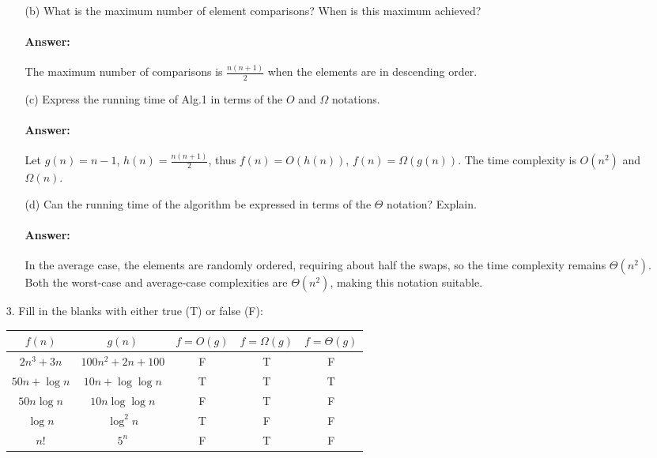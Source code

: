 \documentclass{article}
\begin{document}
\begin{itemize}
\begin{itemize}
\item[(b)] What is the maximum number of element comparisons? When is this maximum achieved?

\paragraph{Answer:} The maximum number of comparisons is $\frac{n(n+1)}{2}$ when the elements are in descending order.

\item[(c)] Express the running time of Alg.1 in terms of the \(O\) and \(\Omega\) notations.

\paragraph{Answer:} Let $g(n) = n - 1$, $h(n) = \frac{n(n+1)}{2}$, thus $f(n) = O(h(n))$, $f(n) = \Omega(g(n))$. The time complexity is $O(n^2)$ and $\Omega(n)$.

\item[(d)] Can the running time of the algorithm be expressed in terms of the \(\Theta\) notation? Explain.

\paragraph{Answer:} In the average case, the elements are randomly ordered, requiring about half the swaps, so the time complexity remains $\Theta(n^2)$. Both the worst-case and average-case complexities are $\Theta(n^2)$, making this notation suitable.
\end{itemize}

\item[3.] Fill in the blanks with either true (T) or false (F):

\begin{center}
    \begin{tabular}{|c|c|c|c|c|} 
    \hline
    $f(n)$ & $g(n)$ & $f=O(g) $ &$f=\Omega(g)$  &$f=\Theta(g)$ \\
    \hline\hline
    $2n^3+3n$ & $100n^2 + 2n +100$ &F &T&F \\\hline
    $50n + \log n $ & $10n+\log\log n$ &T &T& T\\\hline
    $50n\log n$ & $10n\log\log n$ & F&T& F\\\hline
    $\log n$ & $\log^2 n$ &T &F&F \\\hline
    $n!$ & $5^n$ &F  &T&F\\
    \hline
    \end{tabular}
\end{center}


\end{itemize}
\end{document}
